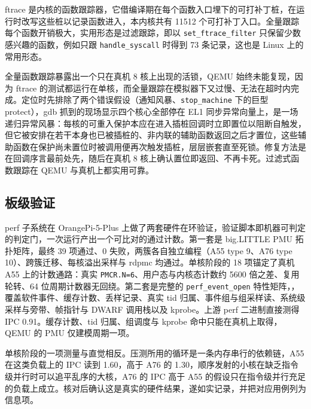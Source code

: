 ftrace 是内核的函数跟踪器，它借编译期在每个函数入口埋下的可打补丁桩，在运行时改写这些桩以记录函数进入，本内核共有 11512 个可打补丁入口。全量跟踪每个函数开销极大，实用形态是过滤跟踪，即以 \texttt{set\_ftrace\_filter} 只保留少数感兴趣的函数，例如只跟 \texttt{handle\_syscall} 时得到 73 条记录，这也是 Linux 上的常用形态。

全量函数跟踪暴露出一个只在真机 8 核上出现的活锁，QEMU 始终未能复现，因为 ftrace 的测试都运行在单核，而全量跟踪在模拟器下又过慢、无法在超时内完成。定位时先排除了两个错误假设（通知风暴、\texttt{stop\_machine} 下的巨型 protect），gdb 抓到的现场显示四个核心全部停在 EL1 同步异常向量上，是一场递归异常风暴：每核的可重入保护本应在进入插桩回调时立即置位以阻断自触发，但它被安排在若干本身也已被插桩的、非内联的辅助函数返回之后才置位，这些辅助函数在保护尚未置位时被调用便再次触发插桩，层层嵌套直至死锁。修复方法是在回调序言最前处先，随后在真机 8 核上确认置位即返回、不再卡死。过滤式函数跟踪在 QEMU 与真机上都实用可靠。

\subsection{板级验证}

perf 子系统在 OrangePi-5-Plus 上做了两套硬件在环验证，验证脚本即机器可判定的判定门，一次运行产出一个可比对的通过计数。第一套是 big.LITTLE PMU 拓扑矩阵，最终 39 项通过、0 失败，两簇各自独立编程（A55 type 9、A76 type 10）、跨簇迁移、每核溢出采样与 rdpmc 均通过。单核阶段的 18 项锚定了真机 A55 上的计数通路：真实 \texttt{PMCR.N=6}、用户态与内核态计数约 5600 倍之差、复用轮转、64 位周期计数器无回绕。第二套是完整的 \texttt{perf\_event\_open} 特性矩阵，，覆盖软件事件、缓存计数、丢样记录、真实 tid 归属、事件组与组采样读、系统级采样与旁带、帧指针与 DWARF 调用栈以及 kprobe。上游 perf 二进制直接测得 IPC 0.91。缓存计数、tid 归属、组调度与 kprobe 命中只能在真机上取得，QEMU 的 PMU 仅建模周期一项。


单核阶段的一项测量与直觉相反。压测所用的循环是一条内存串行的依赖链，A55 在这类负载上的 IPC 读到 1.60，高于 A76 的 1.30，顺序发射的小核在缺乏指令级并行时可以追平乱序的大核，A76 的 IPC 高于 A55 的假设只在指令级并行充足的负载上成立。核对后确认这是真实的硬件结果，遂如实记录，并把对应用例列为信息项。

